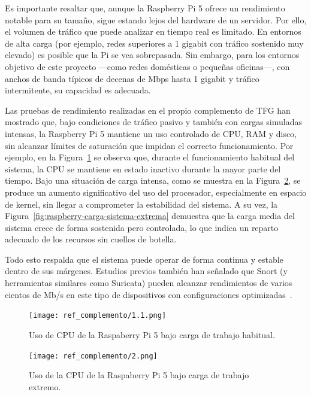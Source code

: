 \documentclass[11pt,a4paper,twoside]{report}
\begin{document}
Es importante resaltar que, aunque la Raspberry Pi 5 ofrece un rendimiento notable para su tamaño, sigue estando lejos del hardware de un servidor. Por ello, el volumen de tráfico que puede analizar en tiempo real es limitado. En entornos de alta carga (por ejemplo, redes superiores a 1 gigabit con tráfico sostenido muy elevado) es posible que la Pi se vea sobrepasada. Sin embargo, para los entornos objetivo de este proyecto —como redes domésticas o pequeñas oficinas—, con anchos de banda típicos de decenas de Mbps hasta 1 gigabit y tráfico intermitente, su capacidad es adecuada.\newline

Las pruebas de rendimiento realizadas en el propio complemento de TFG han mostrado que, bajo condiciones de tráfico pasivo y también con cargas simuladas intensas, la Raspberry Pi 5 mantiene un uso controlado de CPU, RAM y disco, sin alcanzar límites de saturación que impidan el correcto funcionamiento. Por ejemplo, en la Figura~\ref{fig:raspberry-carga-normal} se observa que, durante el funcionamiento habitual del sistema, la CPU se mantiene en estado inactivo durante la mayor parte del tiempo. Bajo una situación de carga intensa, como se muestra en la Figura~\ref{fig:raspberry-carga-extrema}, se produce un aumento significativo del uso del procesador, especialmente en espacio de kernel, sin llegar a comprometer la estabilidad del sistema. A su vez, la Figura~\ref{fig:raspberry-carga-sistema-extrema} demuestra que la carga media del sistema crece de forma sostenida pero controlada, lo que indica un reparto adecuado de los recursos sin cuellos de botella. \newline

Todo esto respalda que el sistema puede operar de forma continua y estable dentro de sus márgenes. Estudios previos también han señalado que Snort (y herramientas similares como Suricata) pueden alcanzar rendimientos de varios cientos de Mb/s en este tipo de dispositivos con configuraciones optimizadas~\cite{SecMaster2024}.

\begin{figure}[H]
	\centering
	\texttt{[image: ref\_complemento/1.1.png]}
	\caption{Uso de CPU de la Raspaberry Pi 5 bajo carga de trabajo habitual.}
	\label{fig:raspberry-carga-normal}
\end{figure}

\begin{figure}[H]
	\centering
	\texttt{[image: ref\_complemento/2.png]}
	\caption{Uso de la CPU de la Raspaberry Pi 5 bajo carga de trabajo extremo.}
	\label{fig:raspberry-carga-extrema}
\end{figure}
\end{document}
